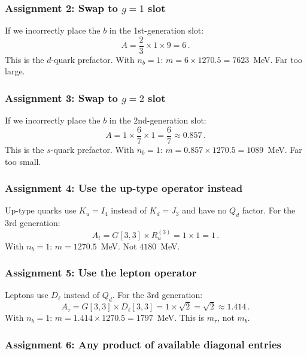 \documentclass[11pt,a4paper]{article}
\theoremstyle{definition}
\theoremstyle{remark}
\begin{document}
\subsubsection{Assignment 2: Swap to $g = 1$ slot}

If we incorrectly place the $b$ in the 1st-generation slot:
\begin{equation}
A = \frac{2}{3} \times 1 \times 9 = 6\,.
\end{equation}
This is the $d$-quark prefactor.  With $n_b = 1$: $m = 6 \times 1270.5 = 7623$~MeV.
Far too large.

\subsubsection{Assignment 3: Swap to $g = 2$ slot}

If we incorrectly place the $b$ in the 2nd-generation slot:
\begin{equation}
A = 1 \times \frac{6}{7} \times 1 = \frac{6}{7} \approx 0.857\,.
\end{equation}
This is the $s$-quark prefactor.  With $n_b = 1$: $m = 0.857 \times 1270.5 = 1089$~MeV.
Far too small.

\subsubsection{Assignment 4: Use the up-type operator instead}

Up-type quarks use $K_u = I_4$ instead of $K_d = J_3$ and have no $Q_d$
factor.  For the 3rd generation:
\begin{equation}
A_t = G[3,3] \times R_u^{(3)} = 1 \times 1 = 1\,.
\end{equation}
With $n_b = 1$: $m = 1270.5$~MeV.  Not $4180$~MeV.

\subsubsection{Assignment 5: Use the lepton operator}

Leptons use $D_\ell$ instead of $Q_d$.  For the 3rd generation:
\begin{equation}
A_\tau = G[3,3] \times D_\ell[3,3] = 1 \times \sqrt{2} = \sqrt{2} \approx 1.414\,.
\end{equation}
With $n_b = 1$: $m = 1.414 \times 1270.5 = 1797$~MeV.  This is $m_\tau$,
not $m_b$.

\subsubsection{Assignment 6: Any product of available diagonal entries}
\end{document}
